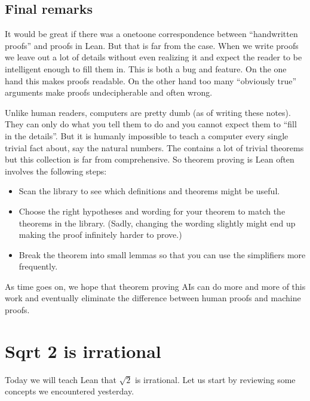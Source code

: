 \documentclass[letterpaper,10pt,english]{sphinxmanual}
\begin{document}
\section{Final remarks}
\label{\detokenize{day3:final-remarks}}
\sphinxAtStartPar
It would be great if there was a one\sphinxhyphen{}to\sphinxhyphen{}one correspondence between “hand\sphinxhyphen{}written proofs” and proofs in Lean. But that is far from the case. When we write proofs we leave out a lot of details without even realizing it and expect the reader to be intelligent enough to fill them in. This is both a bug and feature. On the one hand this makes proofs readable. On the other hand too many “obviously true” arguments make proofs undecipherable and often wrong.

\sphinxAtStartPar
Unlike human readers, computers are pretty dumb (as of writing these notes). They can only do what you tell them to do and you cannot expect them to “fill in the details”. But it is humanly impossible to teach a computer every single trivial fact about, say the natural numbers. The  contains a lot of trivial theorems but this collection is far from comprehensive.
So theorem proving is Lean often involves the following steps:
\begin{itemize}
\item {} 
\sphinxAtStartPar
Scan the library to see which definitions and theorems might be useful.

\item {} 
\sphinxAtStartPar
Choose the right hypotheses and wording for your theorem to match the theorems in the library. (Sadly, changing the wording slightly might end up making the proof infinitely harder to prove.)

\item {} 
\sphinxAtStartPar
Break the theorem into small lemmas so that you can use the simplifiers more frequently.

\end{itemize}

\sphinxAtStartPar
As time goes on, we hope that theorem proving AIs can do more and more of this work and eventually eliminate the difference between human proofs and machine proofs.

\sphinxstepscope


\chapter{Sqrt 2 is irrational}
\label{\detokenize{day4:sqrt-2-is-irrational}}\label{\detokenize{day4:day4}}\label{\detokenize{day4::doc}}
\sphinxAtStartPar
Today we will teach Lean that \(\sqrt{2}\) is irrational.
Let us start by reviewing some concepts we encountered yesterday.
\end{document}
